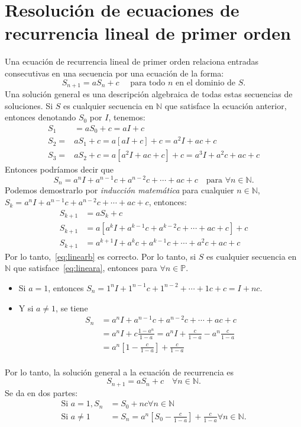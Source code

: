 
\section{Resolución de ecuaciones de recurrencia lineal de primer orden}

Una ecuación de recurrencia lineal de primer orden relaciona entradas consecutivas en una secuencia por una ecuación de la forma:
\begin{equation}\label{eq:lineara}
S_{n+1}=a S_{n}+c\quad\text{ para todo }n\text{ en el dominio de } S.
\end{equation}
Una solución general es una descripción algebraica de todas estas secuencias de soluciones. Si $S$ es cualquier secuencia en $\mathds{N}$ que satisface la ecuación anterior, entonces denotando $S_{0}$ por $I$, tenemos:
\begin{align*}
S_1&=aS_0+c=aI+c \\
S_2=&aS_1+c=a[aI+c]+c=a^2I+ac+c \\
S_3=&aS_2+c=a[a^2I+ac+c]+c=a^3I+a^2c+ac+c
\end{align*}
Entonces podríamos decir que
\begin{equation}\label{eq:linearb}
S_n = a^nI+a^{n-1}c+a^{n-2}c +\cdots+ac+c\quad\text{para }\forall n\in\mathds{N}.
\end{equation}
Podemos demostrarlo por \emph{inducción matemática} para cualquier $n\in\mathds{N}$, $S_k=a^nI+a^{n-1}c+a^{n-2}c+\cdots+ac+c$, entonces:
\begin{align*}
S_{k+1}&=aS_{k} + c  \\
S_{k+1}&=a\left[a^kI+a^{k-1}c+a^{k-2}c+\cdots+ac+c\right] + c\\
S_{k+1}&=a^{k+1}I+a^k c+a^{k-1}c+\cdots+a^2c+ac+c
\end{align*}
Por lo tanto,~\eqref{eq:linearb} es correcto. Por lo tanto, si $S$ es cualquier secuencia en $\mathds{N}$ que satisface~\eqref{eq:lineara}, entonces para $\forall n\in \mathds{P}$.
\begin{itemize}
	\item Si $a=1$, entonces $S_n=1^nI+1^{n-1}c+1^{n-2}+\cdots+1c+c=I+nc$.
	\item Y si $a\neq1$, se tiene
	\begin{align*}
	S_n&=a^{n}I+a^{n-1}c+a^{n-2}c+\cdots+ac+c\\
	&=a^{n}I+c\frac{1-a^n}{1-a}=a^nI+\frac{c}{1-a}-a^n\frac{c}{1-a}\\
	&=a^{n}\left[1-\frac{c}{1-a}\right]+\frac{c}{1-a}\\
	\end{align*}
\end{itemize}
Por lo tanto, la solución general a la ecuación de recurrencia es \[ S_{n+1} = aS_n+c\quad\forall n\in\mathds{N}. \] Se da en dos partes:
\begin{align*}
\text{Si }a=1, S_n&= S_0+ nc\forall n\in\mathds{N}\\
\text{Si }a\neq1&=S_n= a^{n}\left[S_0-\frac{c}{1-a}\right]+\frac{c}{1-a}\forall n\in\mathds{N}.
\end{align*}


